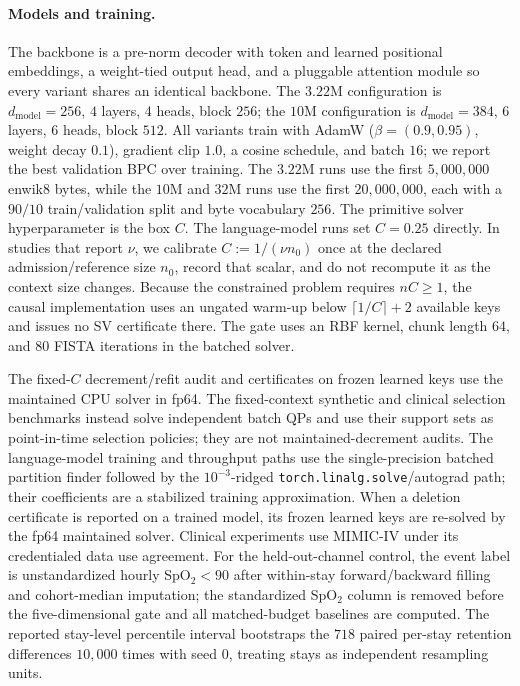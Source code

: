 \paragraph{Models and training.} The backbone is a pre-norm decoder with token and learned
positional embeddings, a weight-tied output head, and a pluggable attention module so every
variant shares an identical backbone. The $3.22$M configuration is $d_{\text{model}}{=}256$,
$4$ layers, $4$ heads, block $256$; the $10$M configuration is $d_{\text{model}}{=}384$, $6$
layers, $6$ heads, block $512$. All variants train with AdamW ($\beta = (0.9, 0.95)$, weight
decay $0.1$), gradient clip $1.0$, a cosine schedule, and batch $16$; we report
the best validation BPC over training. The \(3.22\)M runs use the first
\(5{,}000{,}000\) enwik8 bytes, while the \(10\)M and \(32\)M runs use the first
\(20{,}000{,}000\), each with a $90/10$ train/validation split and byte
vocabulary \(256\). The primitive solver hyperparameter is the box $C$. The
language-model runs set $C=0.25$ directly.
In studies that report $\nu$, we calibrate $C:=1/(\nu n_0)$ once at the declared
admission/reference size $n_0$, record that scalar, and do not recompute it as the
context size changes. Because the constrained problem requires $nC\geq1$, the causal
implementation uses an ungated warm-up below $\lceil1/C\rceil+2$ available keys and
issues no SV certificate there. The gate uses an RBF kernel, chunk length $64$, and
$80$ FISTA iterations in the batched solver.

The fixed-\(C\) decrement/refit audit and certificates on frozen learned keys
use the maintained CPU solver in fp64. The fixed-context synthetic and clinical
selection benchmarks instead solve independent batch QPs and use their support
sets as point-in-time selection policies; they are not maintained-decrement
audits. The language-model training and throughput paths use the
single-precision batched partition finder followed by the \(10^{-3}\)-ridged
\texttt{torch.linalg.solve}/autograd path; their coefficients are a stabilized
training approximation. When a deletion certificate is reported on a trained
model, its frozen learned keys are re-solved by the fp64 maintained solver.
Clinical experiments use MIMIC-IV under its credentialed data use agreement.
For the held-out-channel control, the event label is unstandardized hourly
SpO\(_2<90\) after within-stay forward/backward filling and cohort-median
imputation; the standardized SpO\(_2\) column is removed before the
five-dimensional gate and all matched-budget baselines are computed. The
reported stay-level percentile interval bootstraps the \(718\) paired per-stay
retention differences \(10{,}000\) times with seed \(0\), treating stays as
independent resampling units.

